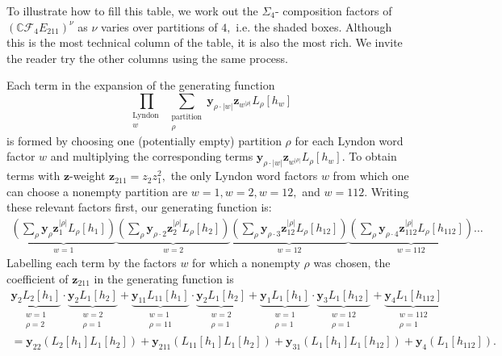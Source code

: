 \documentclass[ALCO, Unicode]{cedram}
\def\C{{\mathbb{C}}}
\begin{document}
To illustrate how to fill this table, we work out the $\Sigma_4$- composition factors of $\left(\C \mathcal{F}_{4}E_{211}\right)^{\nu}$ as $\nu$ varies over partitions of $4,$ i.e. the shaded boxes. Although this is the most technical column of the table, it is also the most rich. We invite the reader try the other columns using the same process. 

Each term in the expansion of the generating function 
\[\displaystyle \prod_{\substack{\text{Lyndon }\\ w}} \sum_{\substack{\text{partition}\\\rho}} \mathbf{y}_{\rho \cdot |w|}\mathbf{z}_{w^{|\rho|}}L_{\rho}[h_w]\] is formed by choosing one (potentially empty) partition $\rho$ for each Lyndon word factor $w$ and multiplying the corresponding terms $\mathbf{y}_{\rho \cdot |w|}\mathbf{z}_{w^{|\rho|}}L_{\rho}[h_w].$ To obtain terms with $\mathbf{z}$-weight $\mathbf{z}_{211} = z_2z_1^2,$ the only Lyndon word factors $w$ from which one can choose a nonempty partition are $w = 1, w = 2, w = 12,$ and $w = 112.$ Writing these relevant factors first, our generating function is:
{\small \begin{align*}
\underbrace{\left(\sum_{\rho}\mathbf{y}_{\rho}\mathbf{z}_1^{|\rho|}L_\rho[h_1]\right)}_{w = 1} \! \underbrace{\left(\sum_{\rho}\mathbf{y}_{\rho\cdot 2}\mathbf{z}_2^{|\rho|}L_\rho[h_2]\right)}_{w = 2} \! \underbrace{\left(\sum_{\rho}\mathbf{y}_{\rho\cdot 3}\mathbf{z}_{12}^{|\rho|}L_\rho[h_{12}]\right)}_{w = 12} \! \underbrace{\left(\sum_{\rho}\mathbf{y}_{\rho\cdot 4}\mathbf{z}_{112}^{|\rho|}L_\rho[h_{112}]\right)}_{w = 112} \! \ldots
\end{align*}}Labelling each term by the factors $w$ for which a nonempty $\rho$ was chosen, the coefficient of $\mathbf{z}_{211}$ in the generating function is 
\begin{align*}
    \underbrace{\mathbf{y}_{2} L_{2}[h_1]}_{\substack{w = 1\\ \rho = 2}} \cdot \underbrace{\mathbf{y}_{2}L_1[h_2]}_{\substack{w = 2\\ \rho = 1}} + \underbrace{\mathbf{y}_{11} L_{11}[h_1]}_{\substack{w = 1\\ \rho = 11}}\cdot \underbrace{\mathbf{y}_{2}L_1[h_2]}_{\substack{w = 2\\ \rho = 1}} + \underbrace{\mathbf{y}_1L_1[h_1]}_{\substack{w = 1\\ \rho = 1}}\cdot \underbrace{\mathbf{y}_{3}L_1[h_{12}] }_{\substack{w = 12\\ \rho = 1}} + \underbrace{\mathbf{y}_4L_{1}[h_{112}]}_{\substack{w = 112\\ \rho = 1}}\\
    = \mathbf{y}_{22}\left(L_2[h_1]L_1[h_2]\right) + \mathbf{y}_{211}\left(L_{11}[h_1]L_1[h_2]\right) + \mathbf{y}_{31}\left(L_1[h_1]L_1[h_{12}] \right) + \mathbf{y}_4 \left(L_1[h_{112}]\right).
\end{align*}
\end{document}
